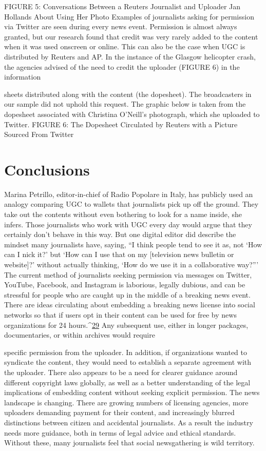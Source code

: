 \begin{enumerate}
FIGURE 5: Conversations Between a Reuters Journalist and Uploader Jan Hollands About Using Her Photo
Examples of journalists asking for permission via Twitter are seen during
every news event. Permission is almost always granted, but our research
found that credit was very rarely added to the content when it was used
onscreen or online. This can also be the case when UGC is distributed by
Reuters and AP. In the instance of the Glasgow helicopter crash, the agencies
advised of the need to credit the uploader (FIGURE 6) in the information

sheets distributed along with the content (the dopesheet). The broadcasters
in our sample did not uphold this request. The graphic below is taken from
the dopesheet associated with Christina O'Neill's photograph, which she
uploaded to Twitter.
FIGURE 6: The Dopesheet Circulated by Reuters with a Picture Sourced From Twitter
\section{Conclusions}
Marina Petrillo, editor-in-chief of Radio Popolare in Italy, has publicly
used an analogy comparing UGC to wallets that journalists pick up off the
ground. They take out the contents without even bothering to look for a
name inside, she infers. Those journalists who work with UGC every day
would argue that they certainly don't behave in this way. But one digital editor
did describe the mindset many journalists have, saying, ``I think people
tend to see it as, not ‘How can I nick it?' but ‘How can I use that on my [television
news bulletin or website]?' without actually thinking, ‘How do we use
it in a collaborative way?'''
The current method of journalists seeking permission via messages on
Twitter, YouTube, Facebook, and Instagram is laborious, legally dubious,
and can be stressful for people who are caught up in the middle of a breaking
news event. There are ideas circulating about embedding a breaking
news license into social networks so that if users opt in their content can
be used for free by news organizations for 24 hours.^{\href{#endnotes}{29}} Any subsequent use,
either in longer packages, documentaries, or within archives would require

specific permission from the uploader. In addition, if organizations wanted
to syndicate the content, they would need to establish a separate agreement
with the uploader.
There also appears to be a need for clearer guidance around different copyright
laws globally, as well as a better understanding of the legal implications
of embedding content without seeking explicit permission.
The news landscape is changing. There are growing numbers of licensing
agencies, more uploaders demanding payment for their content, and
increasingly blurred distinctions between citizen and accidental journalists.
As a result the industry needs more guidance, both in terms of legal advice
and ethical standards. Without these, many journalists feel that social newsgathering
is wild territory.


\end{enumerate}
